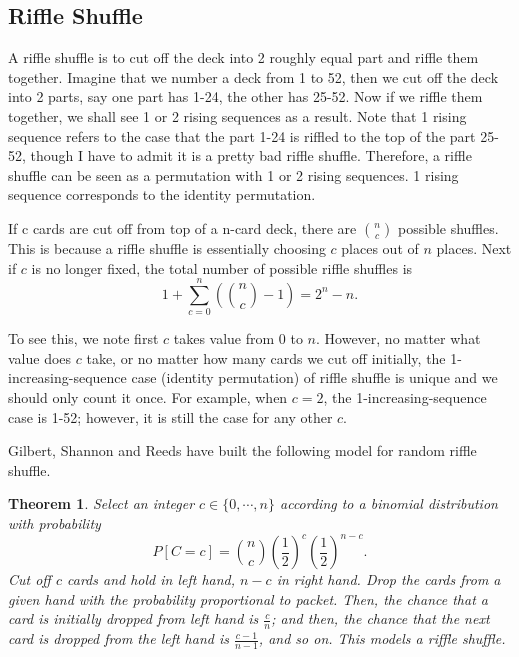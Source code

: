 \documentclass[12pt]{article}
\theoremstyle{plain}
\newtheorem{theorem}{Theorem}
\theoremstyle{definition}
\theoremstyle{remark}
\begin{document}
\newpage
\subsection{Riffle Shuffle}
A riffle shuffle is to cut off the deck into 2 roughly equal part and riffle them together. Imagine that we number a deck from 1 to 52, then we cut off the deck into 2 parts, say one part has 1-24, the other has 25-52. Now if we riffle them together, we shall see 1 or 2 rising sequences as a result. Note that 1 rising sequence refers to the case that the part 1-24 is riffled to the top of the part 25-52, though I have to admit it is a pretty bad riffle shuffle. Therefore, a riffle shuffle can be seen as a permutation with 1 or 2 rising sequences. 1 rising sequence corresponds to the identity permutation.

If c cards are cut off from top of a n-card deck, there are $\binom{n}{c}$ possible shuffles. This is because a riffle shuffle is essentially choosing $c$ places out of $n$ places. Next if $c$ is no longer fixed, the total number of possible riffle shuffles is \[1+\sum_{c=0}^n \left(\binom{n}{c}-1\right)=2^n-n.\]

To see this, we note first $c$ takes value from 0 to $n$. However, no matter what value does $c$ take, or no matter how many cards we cut off initially, the 1-increasing-sequence case (identity permutation) of riffle shuffle is unique and we should only count it once. For example, when $c=2$, the 1-increasing-sequence case is 1-52; however, it is still the case for any other $c$.

Gilbert, Shannon and Reeds have built the following model \cite[\pno~343]{1.1} for random riffle shuffle.

\begin{theorem}
Select an integer $c \in\{0,\cdots,n\}$ according to a binomial distribution with probability \[P[C=c]=\binom{n}{c}\left(\frac{1}{2}\right)^c\left(\frac{1}{2}\right)^{n-c}.\]
Cut off $c$ cards and hold in left hand, $n-c$ in right hand. Drop the cards from a given hand with the probability proportional to packet. Then, the chance that a card is initially dropped from left hand is $\frac{c}{n}$; and then, the chance that the next card is dropped from the left hand is $\frac{c-1}{n-1}$, and so on. This models a riffle shuffle.
\end{theorem}
\end{document}
